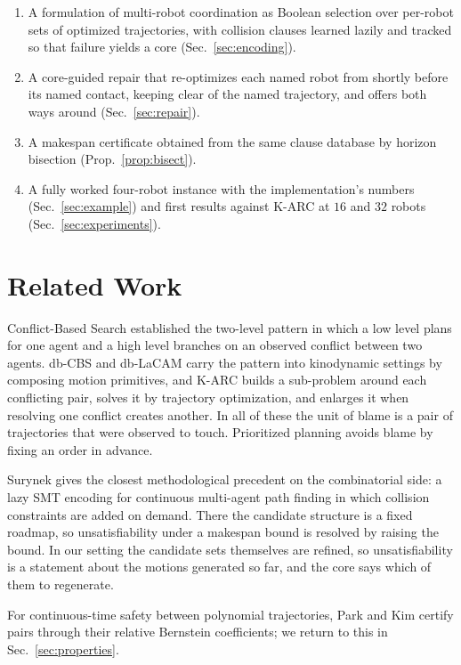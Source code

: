 \documentclass[conference]{IEEEtran}
\theoremstyle{plain}
\theoremstyle{definition}
\begin{document}
\begin{enumerate}
  \item A formulation of multi-robot coordination as Boolean selection over per-robot sets of
        optimized trajectories, with collision clauses learned lazily and tracked so that
        failure yields a core (Sec.~\ref{sec:encoding}).
  \item A core-guided repair that re-optimizes each named robot from shortly before its
        named contact, keeping clear of the named trajectory, and offers both ways around
        (Sec.~\ref{sec:repair}).
  \item A makespan certificate obtained from the same clause database by horizon bisection
        (Prop.~\ref{prop:bisect}).
  \item A fully worked four-robot instance with the implementation's numbers
        (Sec.~\ref{sec:example}) and first results against K-ARC at $16$ and $32$ robots
        (Sec.~\ref{sec:experiments}).
\end{enumerate}

\section{Related Work}

Conflict-Based Search \cite{cbs2015} established the two-level pattern in which a low level
plans for one agent and a high level branches on an observed conflict between two agents.
db-CBS \cite{dbcbs2024} and db-LaCAM \cite{dblacam2025} carry the pattern into kinodynamic
settings by composing motion primitives, and K-ARC \cite{karc2025} builds a sub-problem
around each conflicting pair, solves it by trajectory optimization, and enlarges it when
resolving one conflict creates another. In all of these the unit of blame is a pair of
trajectories that were observed to touch. Prioritized planning \cite{erdmann1987} avoids
blame by fixing an order in advance.

Surynek \cite{surynek2020} gives the closest methodological precedent on the combinatorial
side: a lazy SMT encoding for continuous multi-agent path finding in which collision
constraints are added on demand. There the candidate structure is a fixed roadmap, so
unsatisfiability under a makespan bound is resolved by raising the bound. In our setting the
candidate sets themselves are refined, so unsatisfiability is a statement about the motions
generated so far, and the core says which of them to regenerate.

For continuous-time safety between polynomial trajectories, Park and Kim \cite{parkkim2020}
certify pairs through their relative Bernstein coefficients; we return to this in
Sec.~\ref{sec:properties}.
\end{document}
